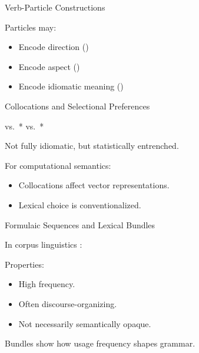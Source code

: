 \begin{frame}{Verb-Particle Constructions}

\begin{exe}
  \ex {}
  \ex {}
\end{exe}

\vspace{0.5em}
Particles may:
\begin{itemize}
  \item Encode direction ()
  \item Encode aspect ()
  \item Encode idiomatic meaning ()
\end{itemize}
\end{frame}

\begin{frame}{Collocations and Selectional Preferences}
\begin{exe}
  \ex {} vs.\ *
  \ex {} vs.\ *
\end{exe}

\vspace{0.5em}
Not fully idiomatic, but statistically entrenched.

\vspace{0.5em}
For computational semantics:
\begin{itemize}
  \item Collocations affect vector representations.
  \item Lexical choice is conventionalized.
\end{itemize}
\end{frame}

\begin{frame}{Formulaic Sequences and Lexical Bundles}

  In corpus linguistics \citep{Biber:Conrad:Reppen:1998}:

\begin{exe}
  \ex {}
  \ex {}
  \ex {}
\end{exe}

\vspace{0.5em}
Properties:
\begin{itemize}
  \item High frequency.
  \item Often discourse-organizing.
  \item Not necessarily semantically opaque.
\end{itemize}

\vspace{0.5em}
Bundles show how usage frequency shapes grammar.
\end{frame}

